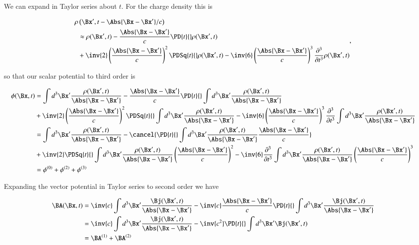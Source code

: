 We can expand in Taylor series about $t$.  For the charge density this is

\begin{equation}\label{eqn:relativisticElectrodynamicsL27:30}
\begin{aligned}
\rho&\left(\Bx', t - \Abs{\Bx - \Bx'}/c\right) \\
&\approx 
\rho(\Bx', t) 
- \frac{\Abs{\Bx - \Bx'}}{c} \PD{t}{} \rho(\Bx', t)  \\
&+ \inv{2} \left(\frac{\Abs{\Bx - \Bx'}}{c}\right)^2 \PDSq{t}{} \rho(\Bx', t) 
- \inv{6} \left(\frac{\Abs{\Bx - \Bx'}}{c}\right)^3 \frac{\partial^3}{\partial t^3} \rho(\Bx', t) 
\end{aligned},
\end{equation}

so that our scalar potential to third order is

\begin{align*}
\phi(\Bx, t) 
&=
\int d^3 \Bx' \frac{\rho(\Bx', t) }{\Abs{\Bx - \Bx'}}
- \frac{\Abs{\Bx - \Bx'}}{c} \PD{t}{} \int d^3 \Bx' \frac{\rho(\Bx', t) }{\Abs{\Bx - \Bx'}} \\
&+ \inv{2} \left(\frac{\Abs{\Bx - \Bx'}}{c}\right)^2 \PDSq{t}{} \int d^3 \Bx' \frac{\rho(\Bx', t) }{\Abs{\Bx - \Bx'}}
- \inv{6} \left(\frac{\Abs{\Bx - \Bx'}}{c}\right)^3 \frac{\partial^3}{\partial t^3} \int d^3 \Bx' \frac{\rho(\Bx', t) }{\Abs{\Bx - \Bx'}} \\
&=
\int d^3 \Bx' \frac{\rho(\Bx', t) }{\Abs{\Bx - \Bx'}}
- 
\cancel{\PD{t}{} \int d^3 \Bx' \frac{\rho(\Bx', t) }{\Abs{\Bx - \Bx'}} 
\frac{\Abs{\Bx - \Bx'}}{c} }
\\
&+ \inv{2} 
\PDSq{t}{} \int d^3 \Bx' \frac{\rho(\Bx', t) }{\Abs{\Bx - \Bx'}}
\left(\frac{\Abs{\Bx - \Bx'}}{c}\right)^2 
- \inv{6} 
\frac{\partial^3}{\partial t^3} \int d^3 \Bx' \frac{\rho(\Bx', t) }{\Abs{\Bx - \Bx'}} 
\left(\frac{\Abs{\Bx - \Bx'}}{c}\right)^3  \\
&= \phi^{(0)} + \phi^{(2)} + \phi^{(3)}
\end{align*}

Expanding the vector potential in Taylor series to second order we have

\begin{align*}
\BA(\Bx, t) 
&=
\inv{c} \int d^3 \Bx' \frac{\Bj(\Bx', t) }{\Abs{\Bx - \Bx'}}
- \inv{c} \frac{\Abs{\Bx - \Bx'}}{c} \PD{t}{} \int d^3 \Bx' \frac{\Bj(\Bx', t) }{\Abs{\Bx - \Bx'}} \\
&=
\inv{c} \int d^3 \Bx' \frac{\Bj(\Bx', t) }{\Abs{\Bx - \Bx'}}
- 
\inv{c^2} \PD{t}{} \int d^3 \Bx' \Bj(\Bx', t) 
\\
&= \BA^{(1)} + \BA^{(2)} 
\end{align*}

